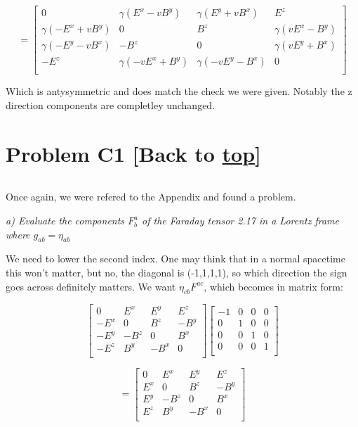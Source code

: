 \documentclass[landscape,letterpaper,10pt,english]{article}
\begin{document}
\[ = \begin{bmatrix}
0 & \gamma (E^x - vB^y) & \gamma(E^y + vB^x) & E^z \\
\gamma(-E^x+vB^y) & 0 & B^z & \gamma(vE^x - B^y) \\
\gamma(-E^y - vB^x) & -B^z & 0 & \gamma(vE^y + B^x)\\
-E^z & \gamma(-vE^x + B^y) & \gamma(-vE^y - B^x) & 0 \\
\end{bmatrix}\]

    Which is antysymmetric and does match the check we were given. Notably
the z direction components are completley unchanged.

    \hypertarget{problem-c1-back-to-top}{%
\section{\texorpdfstring{Problem C1 {[}Back to
\hyperref[toc]{top}{]}}{Problem C1 {[}Back to {]}}}\label{problem-c1-back-to-top}}

\[\label{C1}\]

Once again, we were refered to the Appendix and found a problem.

\emph{a) Evaluate the components \(F^a_b\) of the Faraday tensor 2.17 in
a Lorentz frame where \(g_{ab} = \eta_{ab}\)}

    We need to lower the second index. One may think that in a normal
spacetime this won't matter, but no, the diagonal is (-1,1,1,1), so
which direction the sign goes across definitely matters. We want
\(\eta_{cb} F^{ac}\), which becomes in matrix form:

\[ \begin{bmatrix}
0 & E^x & E^y & E^z \\
-E^x & 0 & B^z & -B^y \\
-E^y & -B^z & 0 & B^x \\
-E^z & B^y & -B^x & 0 \\
\end{bmatrix}\begin{bmatrix}
-1 & 0 & 0 & 0 \\
0 & 1 & 0 & 0 \\
0 & 0 & 1 & 0 \\
0 & 0 & 0 & 1 \\
\end{bmatrix}\]

\[ = \begin{bmatrix}
0 & E^x & E^y & E^z \\
E^x & 0 & B^z & -B^y \\
E^y & -B^z & 0 & B^x \\
E^z & B^y & -B^x & 0 \\
\end{bmatrix}\]
\end{document}
